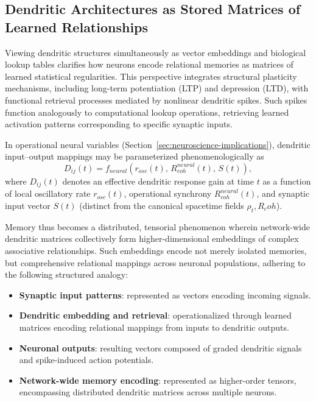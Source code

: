 \documentclass[american,11pt,letterpaper]{article}
\newcommand{\Rcoh}{R_{\mathrm{coh}}}
\def\mathbf#1{#1}%
\def\mathrm#1{#1}%
\def\Rcoh{R_coh}%
\begin{document}
\subsection{Dendritic Architectures as Stored Matrices of Learned Relationships}

Viewing dendritic structures simultaneously as vector embeddings and biological lookup tables clarifies how neurons encode relational memories as matrices of learned statistical regularities. This perspective integrates structural plasticity mechanisms, including long-term potentiation (LTP) and depression (LTD), with functional retrieval processes mediated by nonlinear dendritic spikes. Such spikes function analogously to computational lookup operations, retrieving learned activation patterns corresponding to specific synaptic inputs.

In operational neural variables (Section~\ref{sec:neuroscience-implications}), dendritic input--output mappings may be parameterized phenomenologically as
\begin{equation}
    D_{ij}(t) = f_{\mathrm{neural}}\!\left(r_{\mathrm{osc}}(t),\, R_{\mathrm{coh}}^{\mathrm{neural}}(t),\, \mathbf{S}(t)\right),
\end{equation}
where $D_{ij}(t)$ denotes an effective dendritic response gain at time $t$ as a function of local oscillatory rate $r_{\mathrm{osc}}(t)$, operational synchrony $R_{\mathrm{coh}}^{\mathrm{neural}}(t)$, and synaptic input vector $\mathbf{S}(t)$ (distinct from the canonical spacetime fields $\rho_t, \Rcoh$).

Memory thus becomes a distributed, tensorial phenomenon wherein network-wide dendritic matrices collectively form higher-dimensional embeddings of complex associative relationships. Such embeddings encode not merely isolated memories, but comprehensive relational mappings across neuronal populations, adhering to the following structured analogy:

\begin{itemize}
    \item \textbf{Synaptic input patterns}: represented as vectors encoding incoming signals.
    \item \textbf{Dendritic embedding and retrieval}: operationalized through learned matrices encoding relational mappings from inputs to dendritic outputs.
    \item \textbf{Neuronal outputs}: resulting vectors composed of graded dendritic signals and spike-induced action potentials.
    \item \textbf{Network-wide memory encoding}: represented as higher-order tensors, encompassing distributed dendritic matrices across multiple neurons.
\end{itemize}
\end{document}
